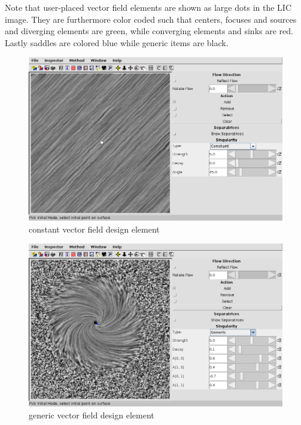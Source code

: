 \documentclass[a4paper,10pt,notitlepage]{scrreprt}
\begin{document}
Note that user-placed vector field elements are shown as large dots in the LIC
image. They are furthermore color coded such that centers, focuses and sources
and diverging elements are green, while converging elements and sinks are red.
Lastly saddles are colored blue while generic items are black.

\begin{figure}
  \centering
  \includegraphics[scale=0.5]{img-3-2/constant.png}
  \caption{constant vector field design element}
  \label{fig:constant}
\end{figure}

\begin{figure}
  \centering
  \includegraphics[scale=0.5]{img-3-2/generic.png}
  \caption{generic vector field design element}
  \label{fig:generic}
\end{figure}
\end{document}
